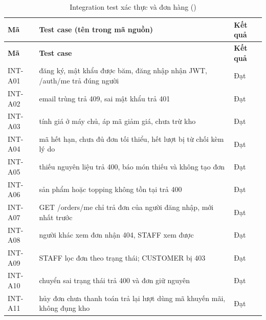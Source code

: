 {\small
\begin{longtable}{@{}L{1.9cm}L{10.6cm}L{1.3cm}@{}}
\caption{Integration test xác thực và đơn hàng ()}\label{tab:inta}\\
\toprule
\textbf{Mã} & \textbf{Test case (tên trong mã nguồn)} & \textbf{Kết quả} \\ \midrule \endfirsthead
\toprule \textbf{Mã} & \textbf{Test case} & \textbf{Kết quả} \\ \midrule \endhead
\bottomrule \endfoot
INT-A01 & đăng ký, mật khẩu được băm, đăng nhập nhận JWT, /auth/me trả đúng người & Đạt \\
INT-A02 & email trùng trả 409, sai mật khẩu trả 401 & Đạt \\
INT-A03 & tính giá ở máy chủ, áp mã giảm giá, chưa trừ kho & Đạt \\
INT-A04 & mã hết hạn, chưa đủ đơn tối thiểu, hết lượt bị từ chối kèm lý do & Đạt \\
INT-A05 & thiếu nguyên liệu trả 400, báo món thiếu và không tạo đơn & Đạt \\
INT-A06 & sản phẩm hoặc topping không tồn tại trả 400 & Đạt \\
INT-A07 & GET /orders/me chỉ trả đơn của người đăng nhập, mới nhất trước & Đạt \\
INT-A08 & người khác xem đơn nhận 404, STAFF xem được & Đạt \\
INT-A09 & STAFF lọc đơn theo trạng thái; CUSTOMER bị 403 & Đạt \\
INT-A10 & chuyển sai trạng thái trả 400 và đơn giữ nguyên & Đạt \\
INT-A11 & hủy đơn chưa thanh toán trả lại lượt dùng mã khuyến mãi, không đụng kho & Đạt \\
\end{longtable}
}